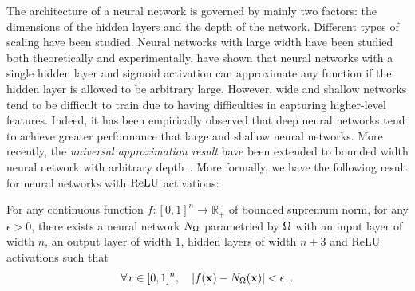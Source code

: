The architecture of a neural network is governed by mainly two factors: the dimensions of the hidden layers and the depth of the network.
Different types of scaling have been studied.
Neural networks with large width have been studied both theoretically and experimentally.
\citet{cybenko1989approximation,hornik1989multilayer} have shown that neural networks with a single hidden layer and sigmoid activation can approximate any function if the hidden layer is allowed to be arbitrary large. 
However, wide and shallow networks tend to be difficult to train due to having difficulties in capturing higher-level features. 
Indeed, it has been empirically observed that deep neural networks tend to achieve greater performance that large and shallow neural networks.
More recently, the \emph{universal approximation result} have been extended to bounded width neural network with arbitrary depth~\cite{lu2017expressive,hanin2017universal}.
More formally, we have the following result for neural networks with $\operatorname{ReLU}$ activations:
\begin{theorem}
  For any continuous function $f:[0,1]^{n} \rightarrow \mathbb{R}_+$ of bounded supremum norm, for any $\epsilon>0$, there exists a neural network $N_\Omega$ parametried by $\Omega$ with an input layer of width $n$, an output layer of width $1$, hidden layers of width $n+3$ and ReLU activations such that 
  \begin{equation}
    \forall x \in [0,1]^n, \quad \left| f(\xvec) - \nn_\weights(\xvec) \right| < \epsilon \enspace.
  \end{equation}
\end{theorem}



%
%
%


